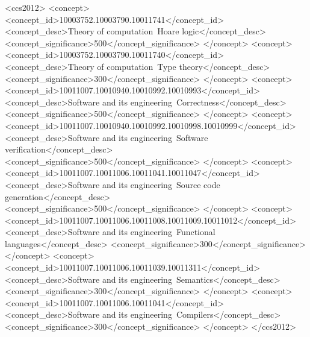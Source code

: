 \documentclass[acmsmall,review,anonymous]{acmart}\settopmatter{printfolios=true}
\begin{document}
\begin{CCSXML}
<ccs2012>
<concept>
<concept_id>10003752.10003790.10011741</concept_id>
<concept_desc>Theory of computation~Hoare logic</concept_desc>
<concept_significance>500</concept_significance>
</concept>
<concept>
<concept_id>10003752.10003790.10011740</concept_id>
<concept_desc>Theory of computation~Type theory</concept_desc>
<concept_significance>300</concept_significance>
</concept>
<concept>
<concept_id>10011007.10010940.10010992.10010993</concept_id>
<concept_desc>Software and its engineering~Correctness</concept_desc>
<concept_significance>500</concept_significance>
</concept>
<concept>
<concept_id>10011007.10010940.10010992.10010998.10010999</concept_id>
<concept_desc>Software and its engineering~Software verification</concept_desc>
<concept_significance>500</concept_significance>
</concept>
<concept>
<concept_id>10011007.10011006.10011041.10011047</concept_id>
<concept_desc>Software and its engineering~Source code generation</concept_desc>
<concept_significance>500</concept_significance>
</concept>
<concept>
<concept_id>10011007.10011006.10011008.10011009.10011012</concept_id>
<concept_desc>Software and its engineering~Functional languages</concept_desc>
<concept_significance>300</concept_significance>
</concept>
<concept>
<concept_id>10011007.10011006.10011039.10011311</concept_id>
<concept_desc>Software and its engineering~Semantics</concept_desc>
<concept_significance>300</concept_significance>
</concept>
<concept>
<concept_id>10011007.10011006.10011041</concept_id>
<concept_desc>Software and its engineering~Compilers</concept_desc>
<concept_significance>300</concept_significance>
</concept>
</ccs2012>
\end{CCSXML}





\end{document}
